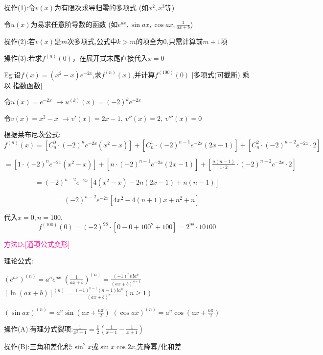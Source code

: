 \documentclass[11pt,a4paper,UTF8]{ctexart}
\begin{document}
\begin{solbox}[分步推导与答题规范]
操作(1):令$v(x)$为有限次求导归零的多项式	(如$x^2, x^3$等)

令$u(x)$为易求任意阶导数的函数	 (如$e^{ax}, \sin ax, \cos ax, \frac{1}{ax+b}$)

操作(2):若$v(x)$是$m$次多项式,公式中$k > m$的项全为0,只需计算前$m+1$项

操作(3):若求$f^{(n)}(0)$，在展开式末尾直接代入$x=0$

Eg:设$f(x) = (x^2 - x) e^{-2x}$,求$f^{(n)}(x)$,并计算$f^{(100)}(0)$	[多项式(可截断) 乘以 指数函数]

令$u(x) = e^{-2x}$  $\to u^{(k)}(x) = (-2)^k e^{-2x}$

令$v(x) = x^2 - x$ $\to v'(x) = 2x - 1,\ v''(x) = 2,\ v'''(x) = 0$

根据莱布尼茨公式: 	
\begin{equation*}
f^{(n)}(x) = [C^0_n \cdot (-2)^n e^{-2x} (x^2 - x)] + [C^1_n \cdot (-2)^{n-1} e^{-2x} (2x - 1)] + [C^2_n \cdot (-2)^{n-2} e^{-2x} \cdot 2]
\end{equation*}


		   $= [1 \cdot (-2)^n e^{-2x} (x^2 - x)] + [n \cdot (-2)^{n-1} e^{-2x} (2x - 1)] + [\frac{n(n-1)}{1\cdot 2} \cdot (-2)^{n-2} e^{-2x} \cdot 2]$

	      	
\begin{equation*}
= (-2)^{n-2} e^{-2x} \left[ 4(x^2 - x) - 2n(2x - 1) + n(n-1) \right]
\end{equation*}


            	
\begin{equation*}
= (-2)^{n-2} e^{-2x} \left[ 4x^2 - 4(n+1)x + n^2 + n \right]
\end{equation*}


代入$x=0, n=100$,    
\begin{equation*}
f^{(100)}(0) = (-2)^{98}\cdot [0-0+100^2+100]=2^{98}\cdot 10100
\end{equation*}

\end{solbox}

\textcolor{DeepPink}{方法D:[通项公式变形]}

\begin{solbox}[分步推导与答题规范]
理论公式:

$(e^{ax})^{(n)} = a^n e^{ax}$	$\left(\frac{1}{ax+b}\right)^{(n)} = \frac{(-1)^n n! a^n}{(ax+b)^{n+1}}$	$[\ln(ax+b)]^{(n)} = \frac{(-1)^{n-1} (n-1)! a^n}{(ax+b)^n} (n \ge 1)$

$(\sin ax)^{(n)} = a^n \sin\left(ax + \frac{n\pi}{2}\right)$		  $(\cos ax)^{(n)} = a^n \cos\left(ax + \frac{n\pi}{2}\right)$

操作(A):有理分式裂项:$\frac{1}{x^2-1}=\frac{1}{2}\left(\frac{1}{x-1} - \frac{1}{x+1}\right)$

操作(B):三角和差化积:$\sin^2 x$或$\sin x \cos 2x$,先降幂/化和差
\end{solbox}
\end{document}
